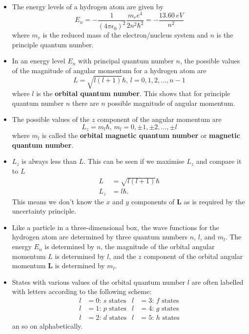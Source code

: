 \documentclass{article}
\begin{document}
\begin{itemize}
\item The energy levels of a hydrogen atom are given by \[E_n = -\frac{1}{(4 \pi \epsilon_0)^2} \frac{m_r e^4}{2 n^2 \hbar^2} = -\frac{\qty{13.60}{eV}}{n^2}\] where $m_r$ is the reduced mass of the electron/nucleus system and $n$ is the principle quantum number.

  \item In an energy level $E_n$ with principal quantum number $n$, the possible values of the magnitude of angular momentum for a hydrogen atom are \[L = \sqrt{l (l + 1)} \hbar, \,l = 0, 1, 2, \ldots, n - 1\] where $l$ is the \textbf{orbital quantum number}. This shows that for principle quantum number $n$ there are $n$ possible magnitude of angular momentum.

  \item The possible values of the $z$ component of the angular momentum are \[L_z = m_l \hbar, \,m_l = 0, \pm 1, \pm 2, \ldots, \pm l\] where $m_l$ is called the \textbf{orbital magnetic quantum number} or \textbf{magnetic quantum number}.

  \item $L_z$ is always less than $L$. This can be seen if we maximise $L_z$ and compare it to $L$ \begin{align*}
          L   & = \sqrt{l (l + 1)} \hbar \\
          L_z & = l \hbar.
        \end{align*} This means we don't know the $x$ and $y$ components of $\mathbf{L}$ as is required by the uncertainty principle.

  \item Like a particle in a three-dimensional box, the wave functions for the hydrogen atom are determined by three quantum numbers $n$, $l$, and $m_l$. The energy $E_n$ is determined by $n$, the magnitude of the orbital angular momentum $L$ is determined by $l$, and the $z$ component of the orbital angular momentum $\mathbf{L}$ is determined by $m_l$.

  \item States with various values of the orbital quantum number $l$ are often labelled with letters according to the following scheme: \begin{align*}
          l & = 0 \text{: } s \text{ states} & l & = 3 \text{: } f \text{ states} \\
          l & = 1 \text{: } p \text{ states} & l & = 4 \text{: } g \text{ states} \\
          l & = 2 \text{: } d \text{ states} & l & = 5 \text{: } h \text{ states}
        \end{align*} an so on alphabetically.


\end{itemize}
\end{document}
